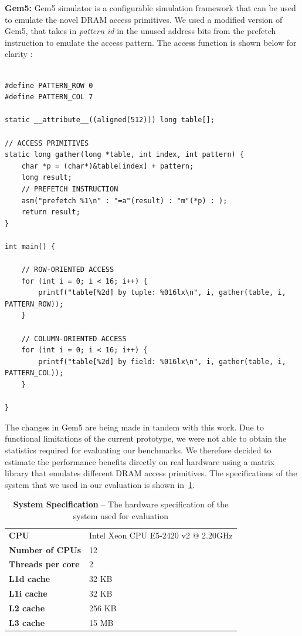 \documentclass[letterpaper]{article}
\begin{document}
\textbf{Gem5:} Gem5 simulator is a configurable simulation framework that can
be used to emulate the novel DRAM access primitives. We used a modified version
of Gem5, that takes in \textit{pattern id} in the unused address bits from the
prefetch instruction to emulate the access pattern. The access function is 
shown below for clarity :

\begin{lstlisting}[caption={Gem5 DRAM Access Primitive
Simulation}]

#define PATTERN_ROW 0
#define PATTERN_COL 7

static __attribute__((aligned(512))) long table[];

// ACCESS PRIMITIVES
static long gather(long *table, int index, int pattern) {
    char *p = (char*)&table[index] + pattern;
    long result;
    // PREFETCH INSTRUCTION
    asm("prefetch %1\n" : "=a"(result) : "m"(*p) : );
    return result;
}

int main() {

	// ROW-ORIENTED ACCESS
	for (int i = 0; i < 16; i++) {
		printf("table[%2d] by tuple: %016lx\n", i, gather(table, i, PATTERN_ROW));
	}

	// COLUMN-ORIENTED ACCESS
	for (int i = 0; i < 16; i++) {
		printf("table[%2d] by field: %016lx\n", i, gather(table, i, PATTERN_COL));
	}

}
\end{lstlisting}
 
The changes in Gem5 are being made in tandem with this work. Due to functional
limitations of the current prototype, we were not able to obtain the statistics 
required for evaluating our benchmarks. 
We therefore decided to estimate the performance benefits directly on real
hardware using a matrix library that emulates different DRAM access primitives.
The specifications of the system that we used in our evaluation is shown
in~\cref{tab:spec}.

\begin{table}
    \centering
    \begin{tabular}{l|l}
    \textbf{CPU} & Intel Xeon CPU E5-2420 v2 $@$ 2.20GHz\\
    \textbf{Number of CPUs} & 12 \\
    \textbf{Threads per core} & 2 \\
    \textbf{L1d cache} & 32 KB \\
	\textbf{L1i cache} & 32 KB \\
	\textbf{L2 cache} & 256 KB \\
	\textbf{L3 cache} & 15 MB \\
  	\end{tabular}
    \caption{
        \textbf{System Specification} -- The hardware specification of the
        system used for evaluation }
    \label{tab:spec}
\end{table}
\end{document}
